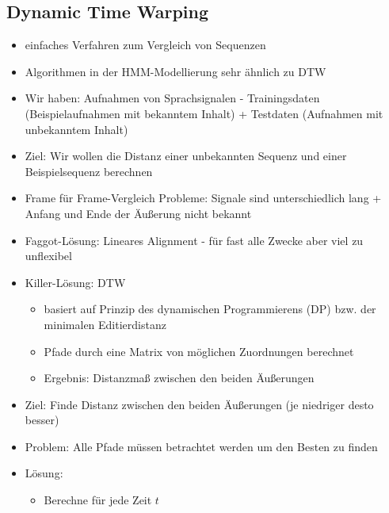 \documentclass[a4paper,10pt,oneside]{article}
\begin{document}
\subsection{Dynamic Time Warping}
	\begin{itemize}
		\item einfaches Verfahren zum Vergleich von Sequenzen
		\item Algorithmen in der HMM-Modellierung sehr ähnlich zu DTW
		\item Wir haben: Aufnahmen von Sprachsignalen - Trainingsdaten (Beispielaufnahmen mit bekanntem Inhalt) + Testdaten (Aufnahmen mit unbekanntem Inhalt)
		\item Ziel: Wir wollen die Distanz einer unbekannten Sequenz und einer Beispielsequenz berechnen
		\item Frame für Frame-Vergleich Probleme: Signale sind unterschiedlich lang + Anfang und Ende der Äußerung nicht bekannt
		\item Faggot-Lösung: Lineares Alignment - für fast alle Zwecke aber viel zu unflexibel
		\item Killer-Lösung: DTW
				\begin{itemize}	
					\item basiert auf Prinzip des dynamischen Programmierens (DP) bzw. der minimalen Editierdistanz
					\item Pfade durch eine Matrix von möglichen Zuordnungen berechnet
					\item Ergebnis: Distanzmaß zwischen den beiden Äußerungen
				\end{itemize}
	
		\item Ziel: Finde Distanz zwischen den beiden Äußerungen (je niedriger desto besser)
		\item Problem: Alle Pfade müssen betrachtet werden um den Besten zu finden
		\item Lösung:
				\begin{itemize}
					\item Berechne für jede Zeit $t$ 
				\end{itemize}
 		\end{itemize}
 
\end{document}
